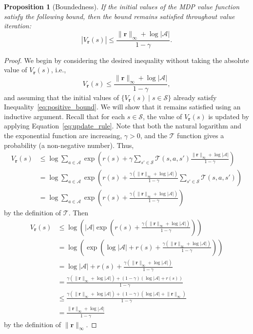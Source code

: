 \documentclass{mpaper}
\newtheorem{proposition}[theorem]{Proposition}
\newcommand{\V}{V_{\mathbf{r}}}
\newcommand{\vbound}{\frac{\rinf + \log|\mathcal{A}|}{1 - \gamma}}
\newcommand{\rinf}{\lVert \mathbf{r} \rVert_\infty}
\begin{document}
\begin{proposition}[Boundedness] \label{thm:bound}
  If the initial values of the MDP value function satisfy the following
  bound, then the bound remains satisfied throughout value iteration:
  \[
    |\V(s)| \le \vbound.
  \]
\end{proposition}
\begin{proof}
  We begin by considering the desired inequality without taking the absolute
  value of $\V(s)$, i.e.,
  \begin{equation} \label{eq:positive_bound}
    \V(s) \le \vbound,
  \end{equation}
  and assuming that the initial values of $\{ \V(s) \mid s \in \mathcal{S} \}$
  already satisfy Inequality~\eqref{eq:positive_bound}. We will show that it
  remains satisfied using an inductive argument. Recall that for each $s \in
  \mathcal{S}$, the value of $\V(s)$ is updated by applying
  Equation~\eqref{eq:update_rule}. Note that both the natural logarithm and the
  exponential function are increasing, $\gamma > 0$, and the $\mathcal{T}$
  function gives a probability (a non-negative number). Thus,
  \begin{align*}
    \V(s) &\le \log \sum_{a \in \mathcal{A}} \exp\left( r(s) + \gamma\sum_{s' \in \mathcal{S}} \mathcal{T}(s, a, s')\frac{\rinf + \log|\mathcal{A}|}{1 - \gamma} \right) \\
          &= \log \sum_{a \in \mathcal{A}} \exp\left( r(s) + \frac{\gamma (\rinf + \log|\mathcal{A}|)}{1 - \gamma}\sum_{s' \in \mathcal{S}} \mathcal{T}(s, a, s') \right) \\
          &= \log \sum_{a \in \mathcal{A}} \exp\left( r(s) + \frac{\gamma (\rinf + \log|\mathcal{A}|)}{1 - \gamma} \right)
  \end{align*}
  by the definition of $\mathcal{T}$. Then
  \begin{align*}
    \V(s) &\le \log \left( |\mathcal{A}| \exp\left( r(s) + \frac{\gamma (\rinf + \log|\mathcal{A}|)}{1 - \gamma} \right) \right) \\
          &= \log \left( \exp\left( \log|\mathcal{A}| + r(s) + \frac{\gamma (\rinf + \log|\mathcal{A}|)}{1 - \gamma} \right) \right) \\
          &= \log|\mathcal{A}| + r(s) + \frac{\gamma (\rinf + \log|\mathcal{A}|)}{1 - \gamma} \\
          &= \frac{\gamma (\rinf + \log|\mathcal{A}|) + (1 - \gamma)(\log|\mathcal{A}| + r(s))}{1 - \gamma} \\
          &\le \frac{\gamma (\rinf + \log|\mathcal{A}|) + (1 - \gamma)(\log|\mathcal{A}| + \rinf)}{1 - \gamma} \\
          &= \vbound
  \end{align*}
  by the definition of $\rinf$.


\end{proof}
\end{document}
